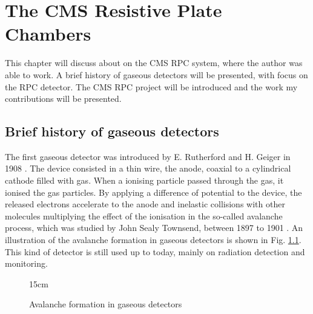 \chapter{The CMS Resistive Plate Chambers}\label{chap:rpc}

This chapter will discuss about on the CMS RPC system, where the author was able to work. A brief history of gaseous detectors will be presented, with focus on the RPC detector. The CMS RPC project will be introduced and the work my contributions will be presented.

\section{Brief history of gaseous detectors}

The first gaseous detector was introduced by E. Rutherford and H. Geiger in 1908 \cite{rutherford1908electrical}. The device consisted in a thin wire, the anode, coaxial to a cylindrical cathode filled with gas. When a ionising particle passed through the gas, it ionised the gas particles. By applying a difference of potential to the device, the released electrons accelerate to the anode and inelastic collisions with other molecules multiplying the effect of the ionisation in the so-called avalanche process, which was studied by John Sealy Townsend, between 1897 to 1901 \cite{peskov2018resistive}. An illustration of the avalanche formation in gaseous detectors is shown in Fig. \ref{fig:avalanche}. This kind of detector is still used up to today, mainly on radiation detection and monitoring.

\begin{figure}[!htm]{15cm} %
\caption{Avalanche formation in gaseous detectors}%
\label{fig:avalanche}
\end{figure}

